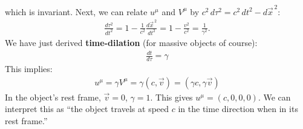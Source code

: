 \documentclass{book}
\theoremstyle{definition}
\begin{document}
which is invariant. Next, we can relate $u^\mu$ and $V^\mu$ by $c^2\,d\tau^2 = c^2\,dt^2 - d\vec{x}^{\,2}$:
\begin{align*}
\frac{d\tau^2}{dt^2} = 1 - \frac{1}{c^2}\frac{d\vec{x}^{\,2}}{dt^2} = 1 - \frac{v^2}{c^2}  = \frac{1}{\gamma^2}.
\end{align*}
We have just derived \textbf{time-dilation} (for massive objects of course):
\begin{align*}
\boxed{\frac{dt}{d\tau} = \gamma}
\end{align*}
This implies:
\begin{align*}
\boxed{u^\mu = \gamma V^\mu = \gamma(c,\vec{v}) = (\gamma c, \gamma\vec{v})}
\end{align*}
In the object's rest frame, $\vec{v} = 0$, $\gamma = 1$. This gives $u^\mu = (c,0,0,0)$. We can interpret this as ``the object travels at speed $c$ in the time direction when in its rest frame.''\\
\end{document}

